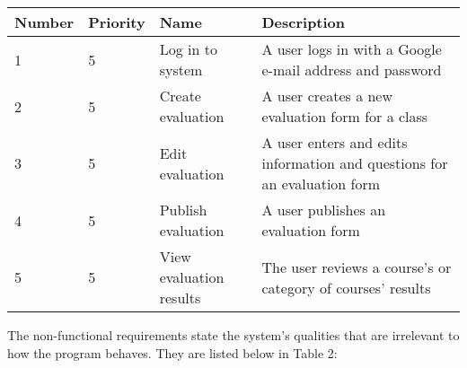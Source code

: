 \documentclass{article}
\begin{document}
\begin{center}

\begin{tabular}{|p{1.5cm}|p{1.5cm}|p{3.5cm}|p{6cm}|} 
\hline
\textbf{Number} & \textbf{Priority} & \textbf{Name} & \textbf{Description} \\
\hline
1 & 5 & Log in to system & A user logs in with a Google e-mail address and password \\ 
\hline
2 & 5 & Create evaluation & A user creates a new evaluation form for a class \\ 
\hline
3 & 5 & Edit evaluation & A user enters and edits information and questions for an evaluation form \\  
\hline
4 & 5 & Publish evaluation & A user publishes an evaluation form \\
\hline
5 & 5 & View evaluation results & The user reviews a course's or category of courses' results \\ 
\hline
\end{tabular}
\end{center}

The non-functional requirements state the system's qualities that are irrelevant to how the program behaves. They are listed below in Table 2:
\end{document}
